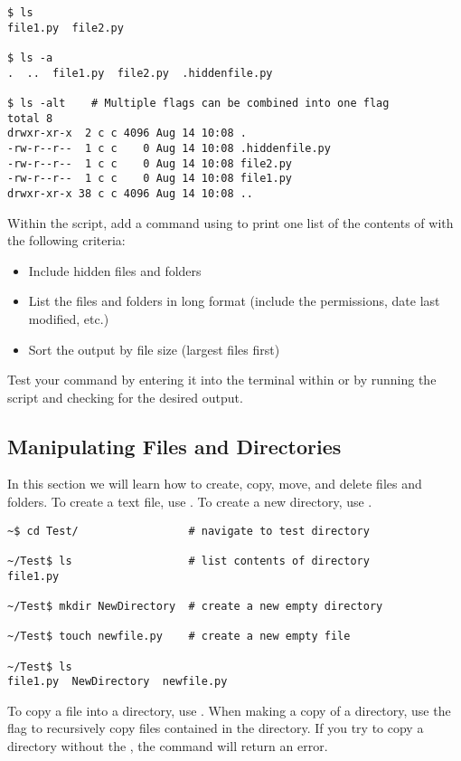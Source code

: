 \begin{lstlisting}
$ ls
file1.py  file2.py

$ ls -a
.  ..  file1.py  file2.py  .hiddenfile.py

$ ls -alt    # Multiple flags can be combined into one flag
total 8
drwxr-xr-x  2 c c 4096 Aug 14 10:08 .
-rw-r--r--  1 c c    0 Aug 14 10:08 .hiddenfile.py
-rw-r--r--  1 c c    0 Aug 14 10:08 file2.py
-rw-r--r--  1 c c    0 Aug 14 10:08 file1.py
drwxr-xr-x 38 c c 4096 Aug 14 10:08 ..
\end{lstlisting}



\begin{problem}
Within the script, add a command using  to print one list of the contents of  with the following criteria:
\begin{itemize}
	\item Include hidden files and folders
	\item List the files and folders in long format (include the permissions, date last modified, etc.)
	\item Sort the output by file size (largest files first)
\end{itemize}
Test your command by entering it into the terminal within  or by running the script and checking for the desired output.
\label{problem:ls-flags}
\end{problem}


\subsection*{Manipulating Files and Directories} %

In this section we will learn how to create, copy, move, and delete files and folders.
To create a text file, use .
To create a new directory, use .

\begin{lstlisting}
~$ cd Test/					# navigate to test directory

~/Test$ ls					# list contents of directory
file1.py

~/Test$ mkdir NewDirectory	# create a new empty directory

~/Test$ touch newfile.py	# create a new empty file

~/Test$ ls
file1.py  NewDirectory  newfile.py
\end{lstlisting}

To copy a file into a directory, use .
When making a copy of a directory, use the   flag to recursively copy files contained in the directory.
If you try to copy a directory without the , the command will return an error.

